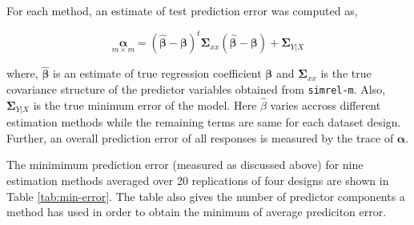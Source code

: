 \documentclass[3p,times,12pt,authoryear]{elsarticle}
\theoremstyle{definition}
\theoremstyle{definition}
\theoremstyle{remark}
\begin{document}
For each method, an estimate of test prediction error was computed as,

\[\underset{m \times m}{\boldsymbol{\alpha}} = 
\left(
\hat{\boldsymbol{\beta}} - \boldsymbol{\beta}
\right) ^t \boldsymbol{\Sigma}_{xx}
\left(
\hat{\boldsymbol{\beta}} - \boldsymbol{\beta}
\right) + \boldsymbol{\Sigma}_{Y|X}\]

where, \(\hat{\boldsymbol{\beta}}\) is an estimate of true regression
coefficient \(\boldsymbol{\beta}\) and \(\boldsymbol{\Sigma}_{xx}\) is
the true covariance structure of the predictor variables obtained from
\texttt{simrel-m}. Also, \(\boldsymbol{\Sigma}_{Y|X}\) is the true
minimum error of the model. Here \(\hat{\beta}\) varies accross
different estimation methods while the remaining terms are same for each
dataset design. Further, an overall prediction error of all responses is
measured by the trace of \(\boldsymbol{\alpha}\).

The minimimum prediction error (measured as discussed above) for nine
estimation methods averaged over 20 replications of four designs are
shown in Table \ref{tab:min-error}. The table also gives the number of
predictor components a method has used in order to obtain the minimum of
average prediciton error.

\end{document}
